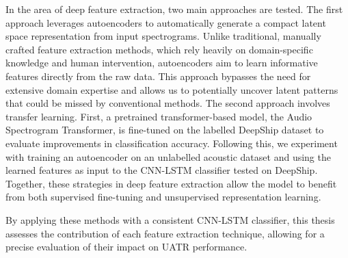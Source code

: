 In the area of deep feature extraction, two main approaches are tested. The first approach leverages autoencoders to automatically generate a compact latent space representation from input spectrograms. Unlike traditional, manually crafted feature extraction methods, which rely heavily on domain-specific knowledge and human intervention, autoencoders aim to learn informative features directly from the raw data. This approach bypasses the need for extensive domain expertise and allows us to potentially uncover latent patterns that could be missed by conventional methods. The second approach involves transfer learning. First, a pretrained transformer-based model, the Audio Spectrogram Transformer, is fine-tuned on the labelled DeepShip dataset to evaluate improvements in classification accuracy. Following this, we experiment with training an autoencoder on an unlabelled acoustic dataset and using the learned features as input to the CNN-LSTM classifier tested on DeepShip. Together, these strategies in deep feature extraction allow the model to benefit from both supervised fine-tuning and unsupervised representation learning.

By applying these methods with a consistent CNN-LSTM classifier, this thesis assesses the contribution of each feature extraction technique, allowing for a precise evaluation of their impact on UATR performance.

